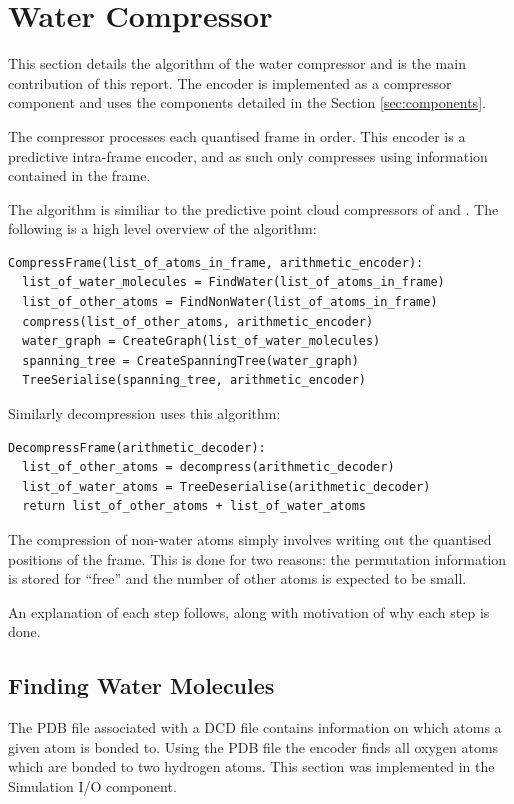 \documentclass[a4paper]{report}
\begin{document}
\section{Water Compressor}

This section details the algorithm of the water compressor and is the main
contribution of this report. The encoder is implemented as a compressor
component and uses the components detailed in the Section
\ref{sec:components}.

The compressor processes each quantised frame in order. This encoder is a
predictive intra-frame encoder, and as such only compresses using information
contained in the frame.

The algorithm is similiar to the predictive point cloud compressors of
\citet{gumholdcomp} and \citet{merrycomp}. The following is a high level
overview of the algorithm:

\begin{verbatim}
CompressFrame(list_of_atoms_in_frame, arithmetic_encoder):
  list_of_water_molecules = FindWater(list_of_atoms_in_frame)
  list_of_other_atoms = FindNonWater(list_of_atoms_in_frame)
  compress(list_of_other_atoms, arithmetic_encoder)
  water_graph = CreateGraph(list_of_water_molecules)
  spanning_tree = CreateSpanningTree(water_graph)
  TreeSerialise(spanning_tree, arithmetic_encoder)
\end{verbatim}

\noindent Similarly decompression uses this algorithm:

\begin{verbatim}
DecompressFrame(arithmetic_decoder):
  list_of_other_atoms = decompress(arithmetic_decoder)
  list_of_water_atoms = TreeDeserialise(arithmetic_decoder)
  return list_of_other_atoms + list_of_water_atoms
\end{verbatim}

The compression of non-water atoms simply involves writing out the quantised
positions of the frame. This is done for two reasons: the permutation
information is stored for ``free'' and the number of other atoms is expected
to be small.

An explanation of each step follows, along with motivation of why each step is
done.


\subsection{Finding Water Molecules}

The PDB file associated with a DCD file contains information on which atoms a
given atom is bonded to. Using the PDB file the encoder finds all oxygen atoms
which are bonded to two hydrogen atoms. This section was implemented in the
Simulation I/O component.
\end{document}
